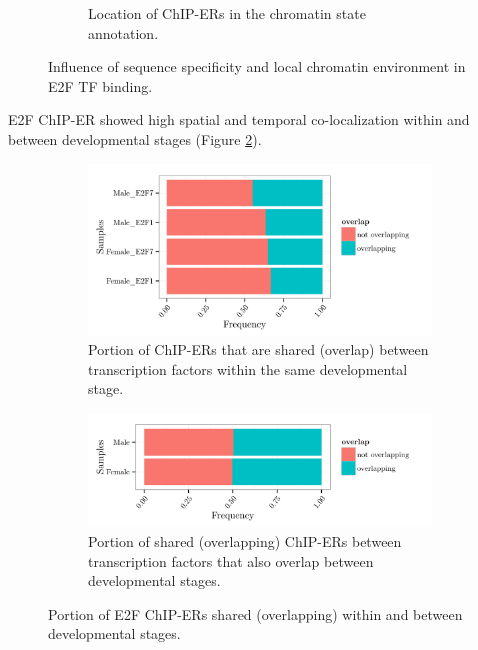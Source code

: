 \documentclass[11pt,twoside,a4paper]{report}
\begin{document}
\begin{figure}
\begin{subfigure}[b]{1\textwidth}
				\caption{Location of ChIP-ERs in the chromatin state annotation.}
			\end{subfigure}
			\caption{Influence of sequence specificity and local chromatin environment in E2F TF binding.}
			\label{fig:E2F_influence}
		\end{figure}
		
		
    	E2F ChIP-ER showed high spatial and temporal co-localization within and between developmental stages (Figure \ref{fig:E2F_colocalization}).
    	
		\begin{figure}[here]
			\setlength{\belowcaptionskip}{5pt}
			\centering
			\begin{subfigure}[b]{0.75\textwidth}
				\includegraphics[width=1\linewidth]{pngs/E2F_overlap.png}
				\caption{Portion of ChIP-ERs that are shared (overlap) between transcription factors within the same developmental stage.}
			\end{subfigure}
			\begin{subfigure}[b]{0.75\textwidth}
				\includegraphics[width=1\linewidth]{pngs/E2F_overlap_overlaps.png}
				\caption{Portion of shared (overlapping) ChIP-ERs between transcription factors that also overlap between developmental stages.}
			\end{subfigure}
			\caption{Portion of E2F ChIP-ERs shared (overlapping) within and between developmental stages.}
			\label{fig:E2F_colocalization}
		\end{figure}
		
\end{document}
